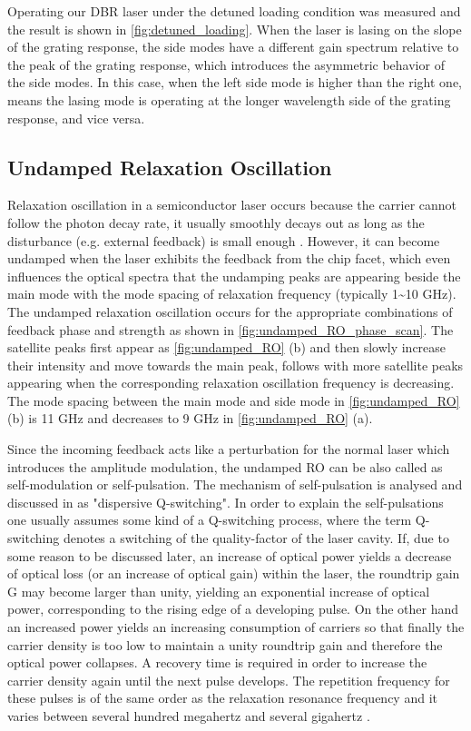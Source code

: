 Operating our DBR laser under the detuned loading condition was measured and the result is shown in \autoref{fig:detuned_loading}. When the laser is lasing on the slope of the grating response, the side modes have a different gain spectrum relative to the peak of the grating response, which introduces the asymmetric behavior of the side modes. In this case, when the left side mode is higher than the right one, means the lasing mode is operating at the longer wavelength side of the grating response, and vice versa.

\subsection{Undamped Relaxation Oscillation}\label{subsec:undamped_RO}
Relaxation oscillation in a semiconductor laser occurs because the carrier cannot follow the photon decay rate, it usually smoothly decays out as long as the disturbance (e.g. external feedback) is small enough \cite{ohtsubo2012semiconductor}. However, it can become undamped when the laser exhibits the feedback from the chip facet, which even influences the optical spectra that the undamping peaks are appearing beside the main mode with the mode spacing of relaxation frequency (typically 1\textasciitilde{}10 GHz). The undamped relaxation oscillation occurs for the appropriate combinations of feedback phase and strength as shown in \autoref{fig:undamped_RO_phase_scan}. The satellite peaks first appear as \autoref{fig:undamped_RO} (b) and then slowly increase their intensity and move towards the main peak, follows with more satellite peaks appearing when the corresponding relaxation oscillation frequency is decreasing. The mode spacing between the main mode and side mode in \autoref{fig:undamped_RO} (b) is 11 GHz and decreases to 9 GHz in \autoref{fig:undamped_RO} (a).

Since the incoming feedback acts like a perturbation for the normal laser which introduces the amplitude modulation, the undamped RO can be also called as self-modulation or self-pulsation. The mechanism of self-pulsation is analysed and discussed in \cite{bandelow1993theory} as "dispersive Q-switching". In order to explain the self-pulsations one usually assumes some kind of a Q-switching process, where the term Q-switching denotes a switching of the quality-factor of the laser cavity. If, due to some reason to be discussed later, an increase of optical power yields a decrease of optical loss (or an increase of optical gain) within the laser, the roundtrip gain G may become larger than unity, yielding an exponential increase of optical power, corresponding to the rising edge of a developing pulse. On the other hand an increased power yields an increasing consumption of carriers so that finally the carrier density is too low to maintain a unity roundtrip gain and therefore the optical power collapses. A recovery time is required in order to increase the carrier density again until the next pulse develops. The repetition frequency for these pulses is of the same order as the relaxation resonance frequency and it varies between several hundred megahertz and several gigahertz \cite{petermann2012laser}.

